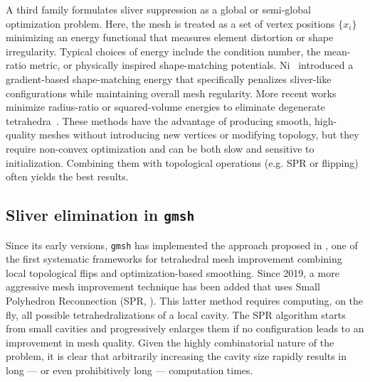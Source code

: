 \documentclass{article}
\begin{document}

A third family formulates sliver suppression as a global or semi-global optimization problem.  
Here, the mesh is treated as a set of vertex positions \(\{x_i\}\) minimizing an energy functional that measures element distortion or shape irregularity.  
Typical choices of energy include the condition number, the mean-ratio metric, or physically inspired shape-matching potentials.  
Ni~\cite{Ni2017_SliverSuppressing} introduced a gradient-based shape-matching energy that specifically penalizes sliver-like configurations while maintaining overall mesh regularity.  
More recent works minimize radius-ratio or squared-volume energies to eliminate degenerate tetrahedra~\cite{WangChenWei2025_RadiusRatioSliverElimination,Yu2024_WSVM}.  
These methods have the advantage of producing smooth, high-quality meshes without introducing new vertices or modifying topology, but they require non-convex optimization and can be both slow and sensitive to initialization.  
Combining them with topological operations (e.g. SPR or flipping) often yields the best results.

\subsection{Sliver elimination in {\texttt{gmsh}}}
Since its early versions, \texttt{gmsh} has implemented the approach proposed in \cite{FreitagOllivierGooch1997_MeshImprovement}, one of the first systematic frameworks for tetrahedral mesh improvement combining local topological flips and optimization-based smoothing. Since 2019, a more aggressive mesh improvement technique has been added that uses Small Polyhedron Reconnection (SPR, \cite{MarotVerhetselRemacle2019_SPR}). This latter method requires computing, on the fly, all possible tetrahedralizations of a local cavity.
The SPR algorithm starts from small cavities and progressively enlarges them if no configuration leads to an improvement in mesh quality.
Given the highly combinatorial nature of the problem, it is clear that arbitrarily increasing the cavity size rapidly results in long — or even prohibitively long — computation times.
\end{document}
